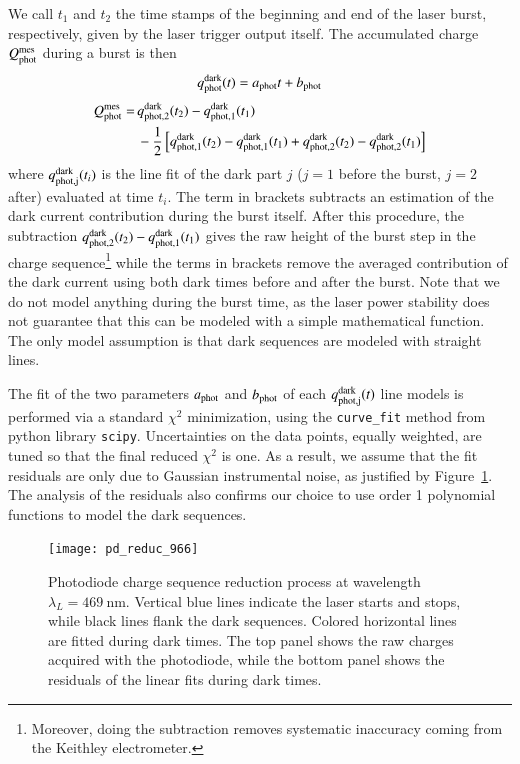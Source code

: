 We call $t_1$ and $t_2$ the time stamps of the beginning and end of the laser burst, respectively, given by the laser trigger output itself. 
The accumulated charge $Q_{\mathrm{phot}}^{\mathrm{mes}}$ during a burst is then
\begin{equation}
q_{\rm phot}^{\rm dark}(t) = a_{\rm phot} t + b_{\rm phot}
\end{equation}
\begin{align}
Q_{\mathrm{phot}}^{\mathrm{mes}} = \, &q_{\rm phot,2}^{\rm dark}(t_2) - q_{\rm phot,1}^{\rm dark}(t_1)\\ & - \frac{1}{2} \left[ q_{\rm phot,1}^{\rm dark}(t_2) -  q_{\rm phot,1}^{\rm dark}(t_1) + q_{\rm phot,2}^{\rm dark}(t_2) - q_{\rm phot,2}^{\rm dark}(t_1)  \right]   \notag 
\end{align}
where $q_{\rm phot,j}^{\rm dark}(t_i)$ is the line fit of the dark part $j$ ($j=1$ before the burst, $j=2$ after) evaluated at time $t_i$. The term in brackets subtracts an estimation of the dark current contribution during the burst itself. After this procedure, the subtraction $q_{\rm phot,2}^{\rm dark}(t_2) - q_{\rm phot,1}^{\rm dark}(t_1)$ gives the raw height of the burst step in the charge sequence\footnote{Moreover, doing the subtraction removes systematic inaccuracy coming from the Keithley electrometer.} while the terms in brackets remove the averaged contribution of the dark current using both dark times before and after the burst. Note that we do not model anything during the burst time, as the laser power stability does not guarantee that this can be modeled with a simple mathematical function. The only model assumption is that dark sequences are modeled with straight lines.

The fit of the two parameters $a_{\rm phot}$ and $b_{\rm phot}$ of each $q_{\rm phot,j}^{\rm dark}(t)$ line models is performed via a standard $\chi^2$ minimization, using the \texttt{curve\_fit} method from python library \texttt{scipy}. Uncertainties on the data points, equally weighted, are tuned so that the final reduced $\chi^2$ is one. As a result, we assume that the fit residuals are only due to Gaussian instrumental noise, as justified by Figure~\ref{fig:pd_reduc}. The analysis of the residuals also confirms our choice to use order 1 polynomial functions to model the dark sequences.

\begin{figure}[!h]
\centering
\texttt{[image: pd\_reduc\_966]}
\caption{Photodiode charge sequence reduction process at wavelength $\lambda_L=\SI{469}{\nm}$. Vertical blue lines indicate the laser starts and stops, while black lines flank the dark sequences. Colored horizontal lines are fitted during dark times. The top panel shows the raw charges acquired with the photodiode, while the bottom panel shows the residuals of the linear fits during dark times.}\label{fig:pd_reduc}
\end{figure}

